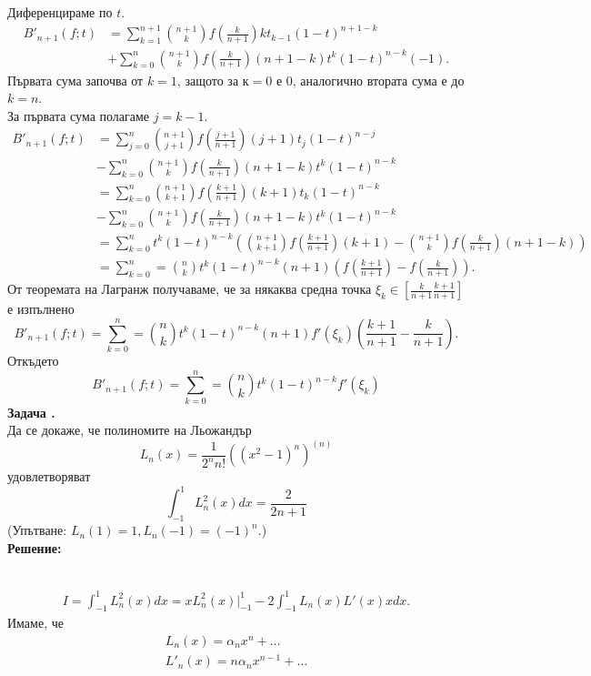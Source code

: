 \documentclass[12pt]{article}
\newcounter{problem}
\newcounter{solution}
\newcommand\problem{%
  \stepcounter{problem}%
  \textbf{Задача \theproblem.}~%
  \\
}
\newcommand\solution{%
  \textbf{Решение:}\\~%
}
\begin{document}
        Диференцираме по $t$.
        \begin{align*}
        B'_{n+1}(f;t) &= \sum_{k=1}^{n+1}{n+1 \choose k} f\left(\frac{k}{n+1}\right)kt_{k-1}(1-t)^{n+1-k} \\&+ \sum_{k=0}^{n}{n+1 \choose k} f\left(\frac{k}{n+1}\right)(n+1-k)t^k(1-t)^{n-k}(-1).
        \end{align*}
        Първата сума започва от $k=1$, защото за $к=0$ е 0, аналогично втората сума е до $k=n$.\\
        За първата сума полагаме $j = k-1$.
        \begin{align*}
        B'_{n+1}(f;t) &= \sum_{j=0}^{n}{n+1 \choose j+1} f\left(\frac{j+1}{n+1}\right)(j+1)t_{j}(1-t)^{n-j} \\&- \sum_{k=0}^{n}{n+1 \choose k} f\left(\frac{k}{n+1}\right)(n+1-k)t^k(1-t)^{n-k} \\&=\sum_{k=0}^{n}{n+1 \choose k+1} f\left(\frac{k+1}{n+1}\right)(k+1)t_{k}(1-t)^{n-k} \\&- \sum_{k=0}^{n}{n+1 \choose k} f\left(\frac{k}{n+1}\right)(n+1-k)t^k(1-t)^{n-k} \\&=\sum_{k=0}^{n}t^k(1-t)^{n-k}\left({n+1 \choose k+1} f\left(\frac{k+1}{n+1}\right)(k+1)-{n+1 \choose k} f\left(\frac{k}{n+1}\right)(n+1-k)\right)\\&=\sum_{k=0}^n={n \choose k} t^k (1-t)^{n-k} (n+1)\left(f\left(\frac{k+1}{n+1}\right)-f\left(\frac{k}{n+1}\right)\right).
        \end{align*}
        От теоремата на Лагранж получаваме, че за някаква средна точка $\xi_k\in\left[\frac{k}{n+1}\frac{k+1}{n+1}\right]$ е изпълнено
        \begin{equation*}
        B'_{n+1}(f;t)=\sum_{k=0}^n={n \choose k} t^k (1-t)^{n-k} (n+1)f'(\xi_k)\left(\frac{k+1}{n+1}-\frac{k}{n+1}\right).
        \end{equation*}
        Откъдето
        \begin{equation*}
        B'_{n+1}(f;t)=\sum_{k=0}^n={n \choose k} t^k (1-t)^{n-k}f'(\xi_k)
        \end{equation*}
    \problem
        Да се докаже, че полиномите на Льожандър 
        \begin{equation*}
        L_n(x) = \frac{1}{2^n n!}\left((x^2-1)^n\right)^{(n)}
        \end{equation*}
        удовлетворяват
        \begin{equation*}
        \int_{-1}^{1}L_n^2(x)dx=\frac{2}{2n+1}
        \end{equation*} 
        (Упътване: $L_n(1)=1, L_n(-1)=(-1)^n$.)\\
    \solution
        \begin{align*}
        I=\int_{-1}^{1}L_n^2(x)dx = xL_n^2(x)\rvert_{-1}^1-2\int_{-1}^{1}L_n(x)L'(x)xdx.
        \end{align*}
        Имаме, че
        \begin{align*}
        L_n(x) = \alpha_nx^n + \ldots\\
        L'_n(x)= n\alpha_nx^{n-1} + \ldots
        \end{align*}
\end{document}
